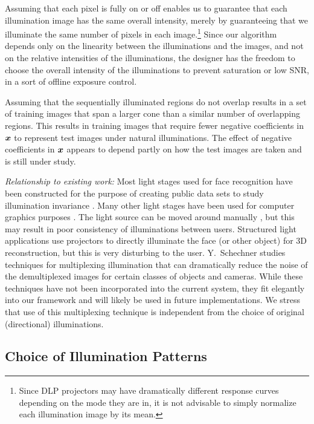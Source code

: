 \documentclass[10pt,journal,letterpaper,compsoc]{IEEEtran}
\begin{document}
Assuming that each pixel is fully on or off enables us to guarantee
that each illumination image has the same overall intensity, merely
by guaranteeing that we illuminate the same number of pixels in each image.\footnote{Since DLP projectors may have dramatically different response
curves depending on the mode they are in, it is not advisable to simply normalize each illumination image by its mean.}
Since our algorithm depends only on  the
linearity between the illuminations and the images, and not on the
relative intensities of the illuminations, the designer has the freedom to choose the overall intensity of the illuminations
to prevent saturation or low SNR, in a sort of offline exposure control.

Assuming that the sequentially illuminated regions do not overlap results in a
set of training images that span a larger cone than a similar number of
overlapping regions.  This results in training images that require fewer
negative coefficients in ${\boldsymbol{x}}$ to represent test images under natural
illuminations.  The effect of negative coefficients in ${\boldsymbol{x}}$ appears to depend
partly on how the test images are taken and is still under study.

{\em Relationship to existing work:} Most light stages used for face recognition have
been constructed for the purpose of creating public data sets to study
illumination invariance \cite{Georghiades2001-PAMI, Gross2008-FGR}.  Many other
light stages have been used for computer graphics purposes
\cite{debevec2000acquiring, jones2005performance}.
The light source can be
moved around manually \cite{masselus2002free}, but this may result in poor
consistency of illuminations between users.  Structured light applications use projectors to
directly illuminate the face (or other object) \cite{zhang2002rapid} for 3D
reconstruction, but this is very disturbing to the user.
Y.\ Schechner \cite{schechner2007multiplexing}
studies techniques for multiplexing illumination that can dramatically reduce the noise
of the demultiplexed images for certain classes of objects and cameras.
While these techniques have not been incorporated into the current
system, they fit elegantly into our framework and will likely be used
in future implementations.  We stress that use of this multiplexing technique
is independent from the choice of original (directional) illuminations.

\subsection{Choice of Illumination Patterns}
\end{document}
